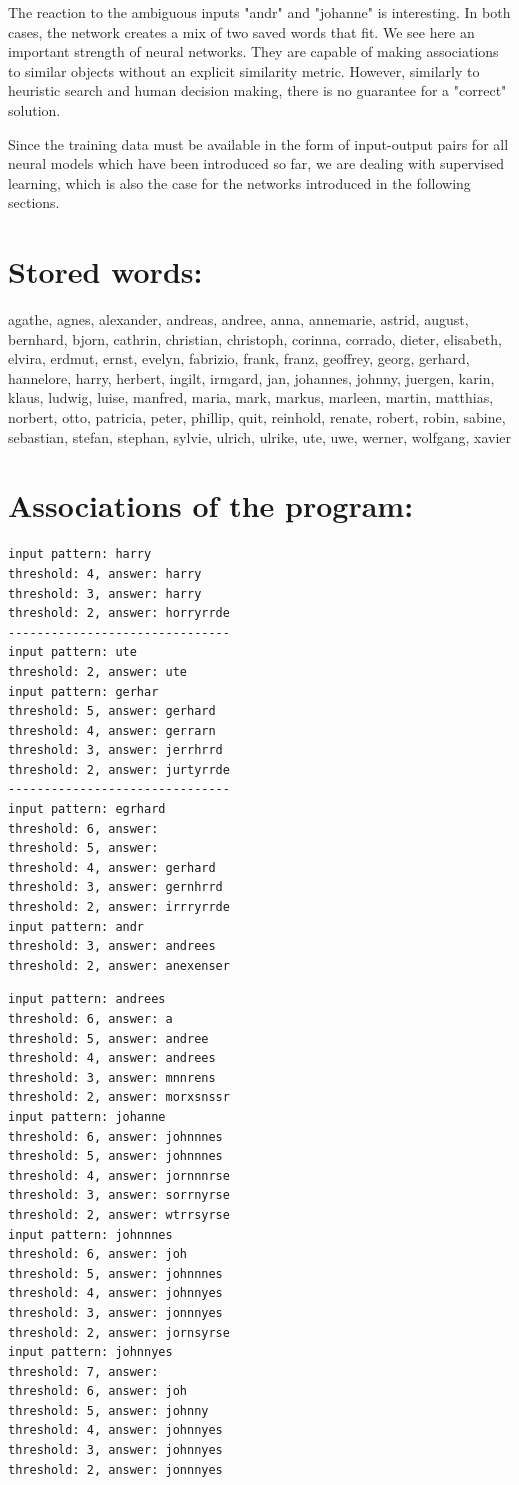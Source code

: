 \documentclass[10pt]{article}
\begin{document}
The reaction to the ambiguous inputs "andr" and "johanne" is interesting. In both cases, the network creates a mix of two saved words that fit. We see here an important strength of neural networks. They are capable of making associations to similar objects without an explicit similarity metric. However, similarly to heuristic search and human decision making, there is no guarantee for a "correct" solution.

Since the training data must be available in the form of input-output pairs for all neural models which have been introduced so far, we are dealing with supervised learning, which is also the case for the networks introduced in the following sections.

\section*{Stored words:}
agathe, agnes, alexander, andreas, andree, anna, annemarie, astrid, august, bernhard, bjorn, cathrin, christian, christoph, corinna, corrado, dieter, elisabeth, elvira, erdmut, ernst, evelyn, fabrizio, frank, franz, geoffrey, georg, gerhard, hannelore, harry, herbert, ingilt, irmgard, jan, johannes, johnny, juergen, karin, klaus, ludwig, luise, manfred, maria, mark, markus, marleen, martin, matthias, norbert, otto, patricia, peter, phillip, quit, reinhold, renate, robert, robin, sabine, sebastian, stefan, stephan, sylvie, ulrich, ulrike, ute, uwe, werner, wolfgang, xavier

\section*{Associations of the program:}
\begin{verbatim}
input pattern: harry
threshold: 4, answer: harry
threshold: 3, answer: harry
threshold: 2, answer: horryrrde
-------------------------------
input pattern: ute
threshold: 2, answer: ute
input pattern: gerhar
threshold: 5, answer: gerhard
threshold: 4, answer: gerrarn
threshold: 3, answer: jerrhrrd
threshold: 2, answer: jurtyrrde
-------------------------------
input pattern: egrhard
threshold: 6, answer:
threshold: 5, answer:
threshold: 4, answer: gerhard
threshold: 3, answer: gernhrrd
threshold: 2, answer: irrryrrde
input pattern: andr
threshold: 3, answer: andrees
threshold: 2, answer: anexenser
\end{verbatim}

\begin{verbatim}
input pattern: andrees
threshold: 6, answer: a
threshold: 5, answer: andree
threshold: 4, answer: andrees
threshold: 3, answer: mnnrens
threshold: 2, answer: morxsnssr
input pattern: johanne
threshold: 6, answer: johnnnes
threshold: 5, answer: johnnnes
threshold: 4, answer: jornnnrse
threshold: 3, answer: sorrnyrse
threshold: 2, answer: wtrrsyrse
input pattern: johnnnes
threshold: 6, answer: joh
threshold: 5, answer: johnnnes
threshold: 4, answer: johnnyes
threshold: 3, answer: jonnnyes
threshold: 2, answer: jornsyrse
input pattern: johnnyes
threshold: 7, answer:
threshold: 6, answer: joh
threshold: 5, answer: johnny
threshold: 4, answer: johnnyes
threshold: 3, answer: johnnyes
threshold: 2, answer: jonnnyes
\end{verbatim}
\end{document}
